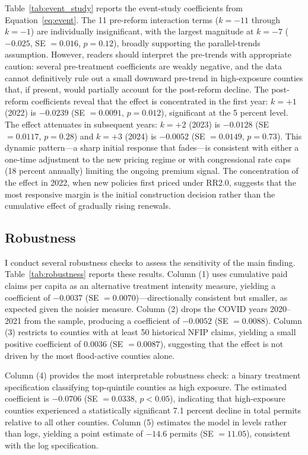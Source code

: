 \documentclass[12pt]{article}
\begin{document}
Table~\ref{tab:event_study} reports the event-study coefficients from Equation~\ref{eq:event}. The 11 pre-reform interaction terms ($k = -11$ through $k = -1$) are individually insignificant, with the largest magnitude at $k = -7$ ($-0.025$, SE $= 0.016$, $p = 0.12$), broadly supporting the parallel-trends assumption. However, readers should interpret the pre-trends with appropriate caution: several pre-treatment coefficients are weakly negative, and the data cannot definitively rule out a small downward pre-trend in high-exposure counties that, if present, would partially account for the post-reform decline. The post-reform coefficients reveal that the effect is concentrated in the first year: $k = +1$ (2022) is $-0.0239$ (SE $= 0.0091$, $p = 0.012$), significant at the 5 percent level. The effect attenuates in subsequent years: $k = +2$ (2023) is $-0.0128$ (SE $= 0.0117$, $p = 0.28$) and $k = +3$ (2024) is $-0.0052$ (SE $= 0.0149$, $p = 0.73$). This dynamic pattern---a sharp initial response that fades---is consistent with either a one-time adjustment to the new pricing regime or with congressional rate caps (18 percent annually) limiting the ongoing premium signal. The concentration of the effect in 2022, when new policies first priced under RR2.0, suggests that the most responsive margin is the initial construction decision rather than the cumulative effect of gradually rising renewals.

\subsection{Robustness}



I conduct several robustness checks to assess the sensitivity of the main finding. Table~\ref{tab:robustness} reports these results. Column (1) uses cumulative paid claims per capita as an alternative treatment intensity measure, yielding a coefficient of $-0.0037$ (SE $= 0.0070$)---directionally consistent but smaller, as expected given the noisier measure. Column (2) drops the COVID years 2020--2021 from the sample, producing a coefficient of $-0.0052$ (SE $= 0.0088$). Column (3) restricts to counties with at least 50 historical NFIP claims, yielding a small positive coefficient of $0.0036$ (SE $= 0.0087$), suggesting that the effect is not driven by the most flood-active counties alone.

Column (4) provides the most interpretable robustness check: a binary treatment specification classifying top-quintile counties as high exposure. The estimated coefficient is $-0.0706$ (SE $= 0.0338$, $p < 0.05$), indicating that high-exposure counties experienced a statistically significant 7.1 percent decline in total permits relative to all other counties. Column (5) estimates the model in levels rather than logs, yielding a point estimate of $-14.6$ permits (SE $= 11.05$), consistent with the log specification.
\end{document}
